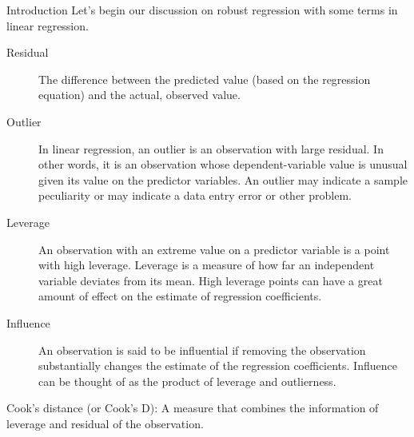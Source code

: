 Introduction
Let's begin our discussion on robust regression with some terms in linear regression.

\begin{description}
\item[Residual] The difference between the predicted value (based on the regression equation) and the actual, observed value.

\item[Outlier] In linear regression, an outlier is an observation with large residual. In other words, it is an observation whose dependent-variable value is unusual given its value on the predictor variables. An outlier may indicate a sample peculiarity or may indicate a data entry error or other problem.

\item[Leverage] An observation with an extreme value on a predictor variable is a point with high leverage. Leverage is a measure of how far an independent variable deviates from its mean. High leverage points can have a great amount of effect on the estimate of regression coefficients.

\item[Influence] An observation is said to be influential if removing the observation substantially changes the estimate of the regression coefficients.  Influence can be thought of as the product of leverage and outlierness.

\end{description}

Cook's distance (or Cook's D): A measure that combines the information of leverage and residual of the observation.







